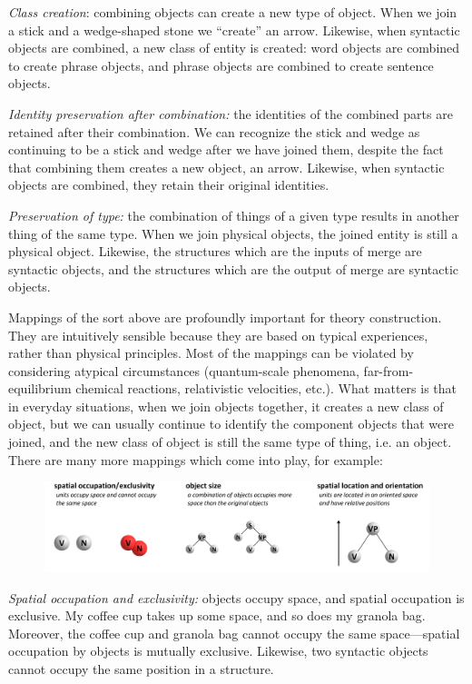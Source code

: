 \textit{Class creation}: combining objects can create a new type of object. When we join a stick and a wedge-shaped stone we “create” an arrow. Likewise, when syntactic objects are combined, a new class of entity is created: word objects are combined to create phrase objects, and phrase objects are combined to create sentence objects. 

\textit{Identity preservation after combination:} the identities of the combined parts are retained after their combination. We can recognize the stick and wedge as continuing to be a stick and wedge after we have joined them, despite the fact that combining them creates a new object, an arrow. Likewise, when syntactic objects are combined, they retain their original identities.

\textit{Preservation of type:} the combination of things of a given type results in another thing of the same type. When we join physical objects, the joined entity is still a physical object. Likewise, the structures which are the inputs of merge are syntactic objects, and the structures which are the output of merge are syntactic objects.

  Mappings of the sort above are profoundly important for theory construction. They are intuitively sensible because they are based on typical experiences, rather than physical principles. Most of the mappings can be violated by considering atypical circumstances (quantum-scale phenomena, far-from-equilibrium chemical reactions, relativistic velocities, etc.). What matters is that in everyday situations, when we join objects together, it creates a new class of object, but we can usually continue to identify the component objects that were joined, and the new class of object is still the same type of thing, i.e. an object. There are many more mappings which come into play, for example:

  
\begin{figure}
\includegraphics[width=\textwidth]{figures/Tilsen-img30.png}
\caption{\missingcaption}
\label{fig:}
\end{figure}
 

\textit{Spatial occupation and exclusivity:} objects occupy space, and spatial occupation is exclusive. My coffee cup takes up some space, and so does my granola bag. Moreover, the coffee cup and granola bag cannot occupy the same space—spatial occupation by objects is mutually exclusive. Likewise, two syntactic objects cannot occupy the same position in a structure. 

